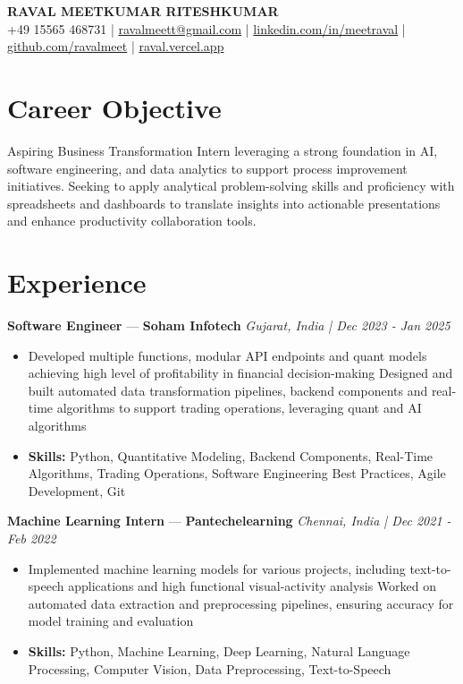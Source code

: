 \documentclass[a4paper,10pt]{article}
\begin{document}
\begin{center}
  {\Large\bfseries RAVAL MEETKUMAR RITESHKUMAR}\\[2pt]
  {\small +49 15565 468731 \;|\; \href{mailto:ravalmeett@gmail.com}{ravalmeett@gmail.com} \;|\; \href{https://www.linkedin.com/in/meetraval/}{linkedin.com/in/meetraval} \;|\; \href{https://github.com/ravalmeet}{github.com/ravalmeet} \;|\; \href{https://raval.vercel.app/}{raval.vercel.app}}
\end{center}
\vspace{-3pt}

\section*{Career Objective}
Aspiring Business Transformation Intern leveraging a strong foundation in AI, software engineering, and data analytics to support process improvement initiatives. Seeking to apply analytical problem-solving skills and proficiency with spreadsheets and dashboards to translate insights into actionable presentations and enhance productivity collaboration tools.\par

\section*{Experience}
\textbf{Software Engineer} — \textbf{Soham Infotech} \hfill \textit{Gujarat, India \;|\; Dec 2023 - Jan 2025}\par
\vspace{1pt}
\begin{itemize}
  \item Developed multiple functions, modular API endpoints and quant models achieving high level of profitability in financial decision-making Designed and built automated data transformation pipelines, backend components and real-time algorithms to support trading operations, leveraging quant and AI algorithms
  \item \textbf{Skills:} Python, Quantitative Modeling, Backend Components, Real-Time Algorithms, Trading Operations, Software Engineering Best Practices, Agile Development, Git
\end{itemize}
\vspace{3pt}
\textbf{Machine Learning Intern} — \textbf{Pantechelearning} \hfill \textit{Chennai, India \;|\; Dec 2021 - Feb 2022}\par
\vspace{1pt}
\begin{itemize}
  \item Implemented machine learning models for various projects, including text-to-speech applications and high functional visual-activity analysis Worked on automated data extraction and preprocessing pipelines, ensuring accuracy for model training and evaluation
  \item \textbf{Skills:} Python, Machine Learning, Deep Learning, Natural Language Processing, Computer Vision, Data Preprocessing, Text-to-Speech
\end{itemize}
\end{document}
